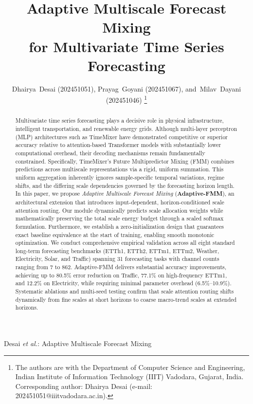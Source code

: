 \documentclass[journal]{IEEEtran}
\begin{document}
\title{Adaptive Multiscale Forecast Mixing\\for Multivariate Time Series Forecasting}

\author{Dhairya~Desai (202451051),
        Prayag~Goyani (202451067),
        and~Milav~Dayani (202451046)%
\thanks{The authors are with the Department of Computer Science and Engineering, Indian Institute of Information Technology (IIIT) Vadodara, Gujarat, India. Corresponding author: Dhairya Desai (e-mail: 202451051@iiitvadodara.ac.in).}}

%
{Desai \MakeLowercase{\textit{et al.}}: Adaptive Multiscale Forecast Mixing}

\maketitle

\begin{abstract}
Multivariate time series forecasting plays a decisive role in physical infrastructure, intelligent transportation, and renewable energy grids. Although multi-layer perceptron (MLP) architectures such as TimeMixer have demonstrated competitive or superior accuracy relative to attention-based Transformer models with substantially lower computational overhead, their decoding mechanisms remain fundamentally constrained. Specifically, TimeMixer's Future Multipredictor Mixing (FMM) combines predictions across multiscale representations via a rigid, uniform summation. This uniform aggregation inherently ignores sample-specific temporal variations, regime shifts, and the differing scale dependencies governed by the forecasting horizon length. In this paper, we propose \textit{Adaptive Multiscale Forecast Mixing} (\textbf{Adaptive-FMM}), an architectural extension that introduces input-dependent, horizon-conditioned scale attention routing. Our module dynamically predicts scale allocation weights while mathematically preserving the total scale energy budget through a scaled softmax formulation. Furthermore, we establish a zero-initialization design that guarantees exact baseline equivalence at the start of training, enabling smooth monotonic optimization. We conduct comprehensive empirical validation across all eight standard long-term forecasting benchmarks (ETTh1, ETTh2, ETTm1, ETTm2, Weather, Electricity, Solar, and Traffic) spanning 31 forecasting tasks with channel counts ranging from 7 to 862. Adaptive-FMM delivers substantial accuracy improvements, achieving up to 80.5\% error reduction on Traffic, 77.1\% on high-frequency ETTm1, and 12.2\% on Electricity, while requiring minimal parameter overhead (6.5\%--10.9\%). Systematic ablations and multi-seed testing confirm that scale attention routing shifts dynamically from fine scales at short horizons to coarse macro-trend scales at extended horizons.
\end{abstract}
\end{document}
